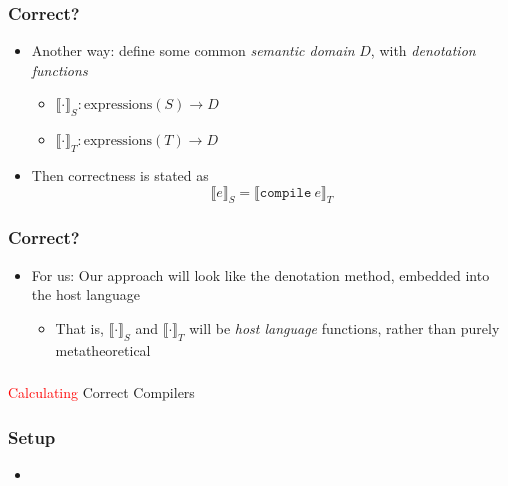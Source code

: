 \documentclass[usenames,dvipsnames]{beamer}
\newcommand{\compile}{\texttt{compile}}
\newcommand{\denot}[2][]{\llbracket #2 \rrbracket_{#1}}
\begin{document}
\begin{frame}
  \frametitle{Correct?}

  \begin{itemize}
    \item Another way: define some common \emph{semantic domain} $D$, with
      \emph{denotation functions}
      \begin{itemize}
        \item $\denot[S]{\cdot} : \text{expressions}(S) \rightarrow D$
        \item $\denot[T]{\cdot} : \text{expressions}(T) \rightarrow D$
      \end{itemize}

    \item Then correctness is stated as
      \begin{equation}
        \denot[S]{e} = \denot[T]{\compile\ e}
      \end{equation}
  \end{itemize}

\end{frame}


\begin{frame}
  \frametitle{Correct?}

  \begin{itemize}
    \item For us: Our approach will look like the denotation method, embedded
      into the host language
      \begin{itemize}
        \item That is, $\denot[S]{\cdot}$ and $\denot[T]{\cdot}$ will be
          \emph{host language} functions, rather than purely metatheoretical
      \end{itemize}
  \end{itemize}
\end{frame}


\begin{frame}
  \frametitle{}

  \begin{center}
    \Huge \textcolor{red}{Calculating} Correct Compilers
  \end{center}
\end{frame}


\begin{frame}
  \frametitle{Setup}

  \begin{itemize}
    \item
  \end{itemize}
\end{frame}
\end{document}
